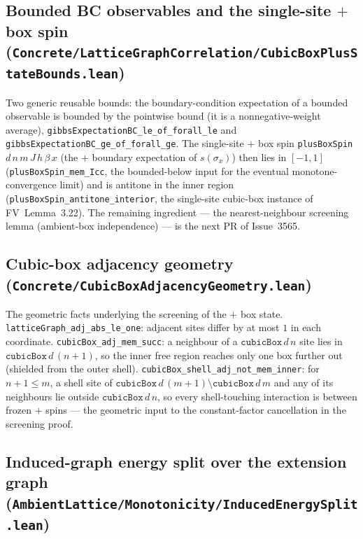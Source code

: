 \documentclass[a4paper,11pt]{article}
\begin{document}
\subsection{Bounded BC observables and the single-site $+$ box spin
(\texttt{Concrete/LatticeGraphCorrelation/CubicBoxPlusStateBounds.lean})}

Two generic reusable bounds: the boundary-condition expectation of a bounded
observable is bounded by the pointwise bound (it is a nonnegative-weight average),
\texttt{gibbsExpectationBC\_le\_of\_forall\_le} and
\texttt{gibbsExpectationBC\_ge\_of\_forall\_ge}. The single-site $+$ box spin
\texttt{plusBoxSpin}~$d\,n\,m\,J\,h\,\beta\,x$ (the $+$ boundary expectation of
$s(\sigma_x)$) then lies in $[-1, 1]$ (\texttt{plusBoxSpin\_mem\_Icc}, the
bounded-below input for the eventual monotone-convergence limit) and is antitone in
the inner region (\texttt{plusBoxSpin\_antitone\_interior}, the single-site
cubic-box instance of FV~Lemma~3.22). The remaining ingredient --- the
nearest-neighbour screening lemma (ambient-box independence) --- is the next PR of
Issue~3565.

\subsection{Cubic-box adjacency geometry
(\texttt{Concrete/CubicBoxAdjacencyGeometry.lean})}

The geometric facts underlying the screening of the $+$ box state.
\texttt{latticeGraph\_adj\_abs\_le\_one}: adjacent sites differ by at most $1$ in
each coordinate. \texttt{cubicBox\_adj\_mem\_succ}: a neighbour of a
$\texttt{cubicBox}\,d\,n$ site lies in $\texttt{cubicBox}\,d\,(n+1)$, so the inner
free region reaches only one box further out (shielded from the outer shell).
\texttt{cubicBox\_shell\_adj\_not\_mem\_inner}: for $n+1 \le m$, a shell site of
$\texttt{cubicBox}\,d\,(m+1) \setminus \texttt{cubicBox}\,d\,m$ and any of its
neighbours lie outside $\texttt{cubicBox}\,d\,n$, so every shell-touching
interaction is between frozen $+$ spins --- the geometric input to the
constant-factor cancellation in the screening proof.

\subsection{Induced-graph energy split over the extension graph
(\texttt{AmbientLattice/Monotonicity/InducedEnergySplit.lean})}
\end{document}
